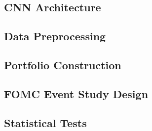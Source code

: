 
\subsection{CNN Architecture}

\subsection{Data Preprocessing}

\subsection{Portfolio Construction}

\subsection{FOMC Event Study Design}

\subsection{Statistical Tests}

